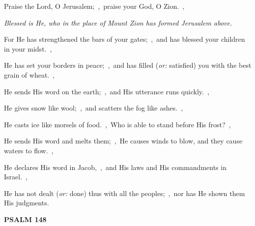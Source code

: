 \documentclass[12pt,twoside,a5paper]{article}
\newcommand{\psalm}[1]{\textbf{PSALM {#1}}\nopagebreak}
\newcommand{\qanona}[1]{{\liturgicalhint{Qanona.} \emph{#1}}}
\newcommand{\translationoption}[1]{\emph{or:} #1}
\begin{document}
\begin{normalparskip}
  Praise the Lord, O Jerusalem;~\sep\ praise your God, O Zion.~\sep

  \qanona{Blessed is He, who in the place of Mount Zion has formed Jerusalem above.}

  For He has strengthened the bars of your gates;~\sep\ and has blessed your children in your midst.~\sep

  He has set your borders in peace;~\sep\ and has filled (\translationoption{satisfied}) you with the best grain of wheat.~\sep

  He sends His word on the earth;~\sep\ and His utterance runs quickly.~\sep

  He gives snow like wool;~\sep\ and scatters the fog like ashes.~\sep

  He casts ice like morsels of food.~\sep\ Who is able to stand before His frost?~\sep

  He sends His word and melts them;~\sep\ He causes winds to blow, and they cause waters to flow.~\sep

  He declares His word in Jacob,~\sep\ and His laws and His commandments in Israel.~\sep

  He has not dealt (\translationoption{done}) thus with all the peoples;~\sep\ nor has He shown them His judgments.
\end{normalparskip}

\psalm{148}
\end{document}
